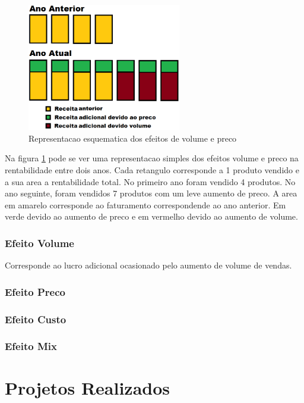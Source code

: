 \documentclass[12pt]{article}
\begin{document}
\begin{figure}[h!]
	\centering
	\includegraphics[width=0.6\textwidth]{img/effects.png}
	\caption{Representacao esquematica dos efeitos de volume e preco}
	\label{fig:effects}
\end{figure}

Na figura \ref{fig:effects} pode se ver uma representacao simples dos efeitos volume e preco na rentabilidade entre dois anos. Cada retangulo corresponde a 1 produto vendido e a sua area a rentabilidade total. No primeiro ano foram vendido 4 produtos. No ano seguinte, foram vendidos 7 produtos com um leve aumento de preco. A area em amarelo corresponde ao faturamento correspondende ao ano anterior. Em verde devido ao aumento de preco e em vermelho devido ao aumento de volume.

\subsubsection{Efeito Volume}
Corresponde ao lucro adicional ocasionado pelo aumento de volume de vendas.

\subsubsection{Efeito Preco}
\subsubsection{Efeito Custo}
\subsubsection{Efeito Mix}

\section{Projetos Realizados}
\end{document}
